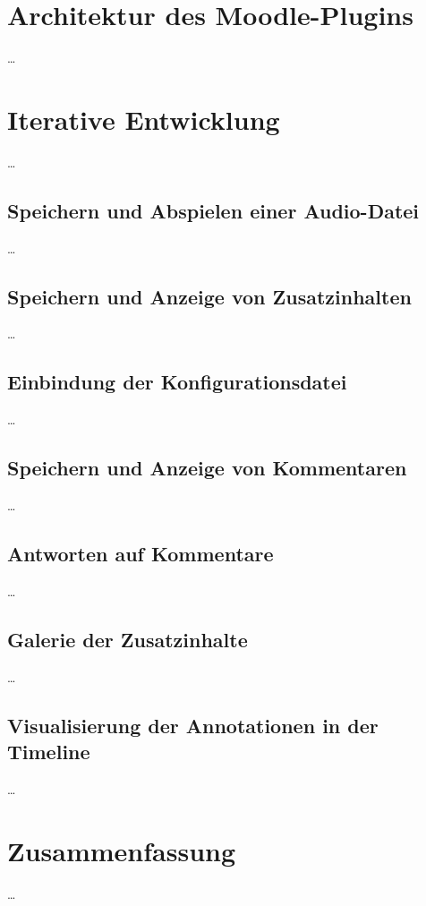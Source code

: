 \section{Architektur des Moodle-Plugins}
\dots


\section{Iterative Entwicklung}
\dots

\subsection{Speichern und Abspielen einer Audio-Datei}
\dots

\subsection{Speichern und Anzeige von Zusatzinhalten}
\dots

\subsection{Einbindung der Konfigurationsdatei}
\dots

\subsection{Speichern und Anzeige von Kommentaren}
\dots

\subsection{Antworten auf Kommentare}
\dots

\subsection{Galerie der Zusatzinhalte}
\dots

\subsection{Visualisierung der Annotationen in der Timeline}
\dots

\section{Zusammenfassung}
\dots